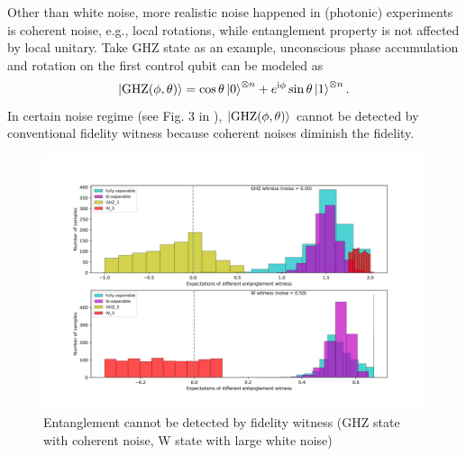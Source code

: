 \documentclass[
reprint,
aps,
pra,
floatfix,
]{revtex4-2}
\theoremstyle{plain}
\theoremstyle{definition}
\newcommand{\ghz}{\text{GHZ}}
\begin{document}
Other than white noise, more realistic noise happened in (photonic) experiments is coherent noise, e.g., local rotations,
while entanglement property is not affected by local unitary.
Take GHZ state as an example, unconscious phase accumulation and 
rotation on the first control qubit can be modeled as 
\cite{zhouEntanglementDetectionCoherent2020}
\begin{equation}
	\ket{\ghz(\phi,\theta)}=
	\cos\theta\ket{0}^{\otimes n}+e^{\ii \phi}\sin\theta\ket{1}^{\otimes n}.
	\label{eq:coherent_noise}
\end{equation}
In certain noise regime (see Fig. 3 in \cite{zhouEntanglementDetectionCoherent2020}), $\ket{\ghz(\phi,\theta)}$ cannot be detected by conventional fidelity witness because coherent noises diminish the fidelity.
\begin{figure}[!ht]
	\centering
	\includegraphics[width=.9\linewidth]{./Code/fidelity_witness_compare_2_long.png}
	\caption{Entanglement cannot be detected by fidelity witness (GHZ state with coherent noise, W state with large white noise)}
\end{figure}
\end{document}
